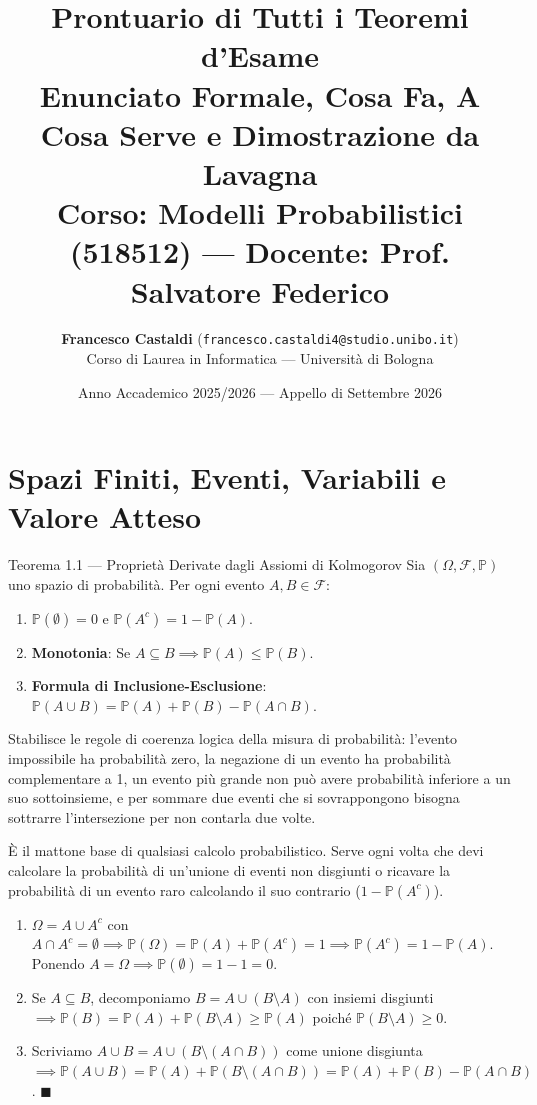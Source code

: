 \documentclass[11pt,a4paper]{report}
\title{\textbf{\Huge Prontuario di Tutti i Teoremi d'Esame}\\[0.2cm]
\Large Enunciato Formale, Cosa Fa, A Cosa Serve e Dimostrazione da Lavagna\\[0.3cm]
\large \textbf{Corso}: Modelli Probabilistici (518512) --- \textbf{Docente}: Prof. Salvatore Federico}
\author{\textbf{Francesco Castaldi} (\texttt{francesco.castaldi4@studio.unibo.it})\\Corso di Laurea in Informatica --- Università di Bologna}
\date{Anno Accademico 2025/2026 --- Appello di Settembre 2026}
\newcommand{\PP}{\mathbb{P}}
\newcommand{\F}{\mathcal{F}}
\newcommand{\1}{\mathbf{1}}
\begin{document}
\maketitle
\tableofcontents
\newpage

\chapter{Spazi Finiti, Eventi, Variabili e Valore Atteso}

\begin{teoremabox}{Teorema 1.1 --- Proprietà Derivate dagli Assiomi di Kolmogorov}
Sia $(\Omega, \F, \PP)$ uno spazio di probabilità. Per ogni evento $A, B \in \F$:
\begin{enumerate}[leftmargin=*]
    \item $\PP(\emptyset) = 0$ e $\PP(A^c) = 1 - \PP(A)$.
    \item \textbf{Monotonia}: Se $A \subseteq B \implies \PP(A) \le \PP(B)$.
    \item \textbf{Formula di Inclusione-Esclusione}: $\PP(A \cup B) = \PP(A) + \PP(B) - \PP(A \cap B)$.
\end{enumerate}
\end{teoremabox}

\begin{cosafa}
Stabilisce le regole di coerenza logica della misura di probabilità: l'evento impossibile ha probabilità zero, la negazione di un evento ha probabilità complementare a 1, un evento più grande non può avere probabilità inferiore a un suo sottoinsieme, e per sommare due eventi che si sovrappongono bisogna sottrarre l'intersezione per non contarla due volte.
\end{cosafa}

\begin{acosaserve}
È il mattone base di qualsiasi calcolo probabilistico. Serve ogni volta che devi calcolare la probabilità di un'unione di eventi non disgiunti o ricavare la probabilità di un evento raro calcolando il suo contrario ($1 - \PP(A^c)$).
\end{acosaserve}

\begin{dimostrazione}
\begin{enumerate}
    \item $\Omega = A \cup A^c$ con $A \cap A^c = \emptyset \implies \PP(\Omega) = \PP(A) + \PP(A^c) = 1 \implies \PP(A^c) = 1 - \PP(A)$. Ponendo $A=\Omega \implies \PP(\emptyset) = 1 - 1 = 0$.
    \item Se $A \subseteq B$, decomponiamo $B = A \cup (B \setminus A)$ con insiemi disgiunti $\implies \PP(B) = \PP(A) + \PP(B \setminus A) \ge \PP(A)$ poiché $\PP(B \setminus A) \ge 0$.
    \item Scriviamo $A \cup B = A \cup (B \setminus (A \cap B))$ come unione disgiunta $\implies \PP(A \cup B) = \PP(A) + \PP(B \setminus (A \cap B)) = \PP(A) + \PP(B) - \PP(A \cap B)$. $\blacksquare$
\end{enumerate}
\end{dimostrazione}
\end{document}
